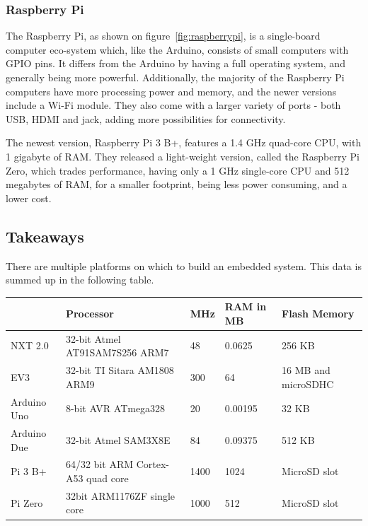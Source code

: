 \subsubsection{Raspberry Pi}\label{subsec:rpispecs}
The Raspberry Pi, as shown on figure~\autoref{fig:raspberrypi}, is a single-board computer eco-system which, like the Arduino, consists of small computers with GPIO pins.
It differs from the Arduino by having a full operating system, and generally being more powerful.
Additionally, the majority of the Raspberry Pi computers have more processing power and memory, and the newer versions include a Wi-Fi module.
They also come with a larger variety of ports - both USB, HDMI and jack, adding more possibilities for connectivity.

The newest version, Raspberry Pi 3 B+, features a 1.4 GHz quad-core CPU, with 1 gigabyte of RAM\cite{raspberrypi}.
They released a light-weight version, called the Raspberry Pi Zero, which trades performance, having only a 1 GHz single-core CPU and 512 megabytes of RAM, for a smaller footprint, being less power consuming, and a lower cost.

\subsection{Takeaways}
\label{platformtakeaways}
There are multiple platforms on which to build an embedded system.
This data is summed up in the following table.

\begin{table}[h]
	\begin{adjustbox}{max width=\textwidth}
	\begin{tabular}{|l|l|l|l|l|}
		\hline
		                & Processor                          & MHz 	& RAM in MB    & Flash Memory          	\\\hline
		NXT 2.0 		& 32-bit Atmel AT91SAM7S256 ARM7     & 48  	& 0.0625   & 256 KB                   	\\
		EV3     		& 32-bit TI Sitara AM1808 ARM9       & 300 	& 64   & 16 MB and microSDHC 			\\
		Arduino Uno    	& 8-bit AVR ATmega328                & 20  	& 0.00195    & 32 KB                    \\
		Arduino Due    	& 32-bit Atmel SAM3X8E               & 84  	& 0.09375   & 512 KB                   	\\
		Pi 3 B+      	& 64/32 bit ARM Cortex-A53 quad core & 1400 & 1024    & MicroSD slot            	\\
		Pi Zero       	& 32bit ARM1176ZF single core        & 1000 & 512  & MicroSD slot 					\\\hline
	\end{tabular}
\end{adjustbox}
\end{table}

